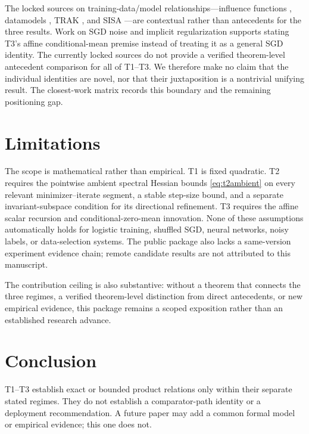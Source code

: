 \documentclass{article}
\begin{document}
The locked sources on training-data/model relationships---influence functions
\citep{koh2017understanding}, datamodels \citep{ilyas2022datamodels}, TRAK
\citep{park2023trak}, and SISA \citep{bourtoule2021sisa}---are contextual
rather than antecedents for the three results. Work on SGD noise and implicit
regularization \citep{mandt2017sgd,smith2017bayesian,smith2021origin}
supports stating T3's affine conditional-mean premise instead of treating it
as a general SGD identity. The currently locked sources do not provide a
verified theorem-level antecedent comparison for all of T1--T3. We therefore
make no claim that the individual identities are novel, nor that their
juxtaposition is a nontrivial unifying result. The closest-work matrix records
this boundary and the remaining positioning gap.

\section{Limitations}
\label{sec:limitations}

The scope is mathematical rather than empirical. T1 is fixed quadratic. T2
requires the pointwise ambient spectral Hessian bounds
\eqref{eq:t2ambient} on every relevant minimizer--iterate segment, a stable
step-size bound, and a separate invariant-subspace condition for its directional
refinement. T3 requires the affine scalar recursion and conditional-zero-mean
innovation. None of these assumptions automatically holds for logistic
training, shuffled SGD, neural networks, noisy labels, or data-selection
systems. The public package also lacks a same-version experiment evidence
chain; remote candidate results are not attributed to this manuscript.

The contribution ceiling is also substantive: without a theorem that connects
the three regimes, a verified theorem-level distinction from direct antecedents,
or new empirical evidence, this package remains a scoped exposition rather
than an established research advance.

\section{Conclusion}

T1--T3 establish exact or bounded product relations only within their separate
stated regimes. They do not establish a comparator-path identity or a
deployment recommendation. A future paper may add a common formal model or
empirical evidence; this one does not.
\end{document}
